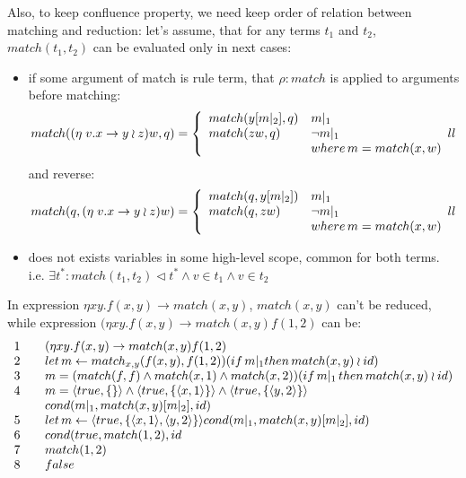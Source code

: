 \documentclass[10pt]{article}
\begin{document}
  Also, to keep confluence property, we need keep order of relation between matching and
  reduction:  let's assume, that for any terms $t_1$ and $t_2$, $match(t_1,t_2)$ can be
  evaluated only in next cases:
  \begin{itemize}
    \item if some argument of match is rule term, that $\rho:match$ is applied to arguments before matching: 
    $$match((\eta\;v.x\to y \wr z) w, q) = \left\{
    \begin{array}{l l}
      match(y[m|_{2}],q) &  m|_{1} \\
      match(z w, q)  & \neg m|_{1} \\
                     & where\,m=match(x,w)
    \end{array}{l l}\right.  
    $$
      and reverse:
     $$
      match(q,(\eta\;v.x\to y \wr z) w )=\left\{
    \begin{array}{l l}
      match(q,y[m|_{2}]) &  m|_{1} \\
      match(q,z w)  & \neg m|_{1} \\
                     & where\,m=match(x,w)
    \end{array}{l l}\right.        
     $$ 
    \item does not exists variables in some high-level scope, common for both
  terms.  i.e.  $\exists t^*: match(t_1,t_2)\lhd t^* \land v\in t_1\land v\in t_2$  
  \end{itemize}
  In expression $\eta x y. f(x,y) \to match(x,y)$, 
  $match(x,y)$ can't be reduced, while  expression 
  $(\eta x y. f(x,y)\to match(x,y) f(1,2)$ can be:
  $$
   \begin{array}{l l l}
    1 &  & (\eta x y. f(x,y)\to match(x,y) f(1,2) \\
    2 &  & let\,m\leftarrow match_{x,y}(f(x,y),f(1,2)) (if\,m|_{1} then\,match(x,y)\wr id) \\
    3 &  & m=(match(f,f) \land match(x,1)\land match(x,2)) (if\,m|_{1}\,then\,match(x,y)\wr id) \\
    4 &  & m=\langle true, \{\} \rangle  \land
             \langle true, \{\langle x, 1\rangle\}\rangle \land 
             \langle true, \{\langle y, 2\rangle\}\rangle \\
      &  &     cond(m|_{1},match(x,y)[m|_2],id) \\ 
    5 &  & let\, m\leftarrow \langle true, \{ \langle x,1\rangle,\langle y,2\rangle\}\rangle
           cond(m|_{1},match(x,y)[m|_2],id) \\
    6 &  & cond(true,match(1,2),id \\       
    7 &  & match(1,2) \\
    8 &  & false        
   \end{array}
  $$
\end{document}
